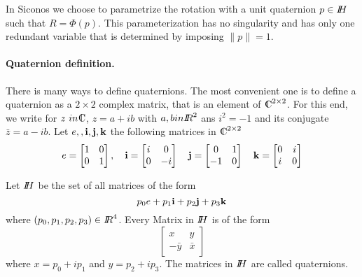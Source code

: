 In Siconos we choose to parametrize the rotation with a unit quaternion $p \in \mbox{\rm $I\!\!H$}$ such that $R = \Phi(p)$. This parameterization has no singularity and has only one redundant variable that is determined by imposing $\|p\|=1$.


\paragraph{Quaternion definition.} There is many ways to define quaternions. The most convenient one is to define a quaternion as 
a $2\times 2$ complex matrix, that is an element of $\CC^{2\times 2}$. For this end, we write for $z \ in \CC$, $z=a+ib$ with $a,b in \mbox{\rm $I\!\!R$}^2$ ans $i^2=-1$ and its conjugate $\bar z= a-ib$. Let ${e, \bf, i, j, k}$ the following matrices in $\CC^{2\times 2}$
\begin{equation}
  \label{eq:127}
  e =
  \begin{bmatrix}
    1 & 0 \\
    0 & 1  \\
  \end{bmatrix},
  \quad   \bf{i} =
  \begin{bmatrix}
    i & 0 \\
    0 & -i  \\
  \end{bmatrix}
  \quad   \bf{j} =
  \begin{bmatrix}
    0 & 1 \\
    -1 & 0  \\
  \end{bmatrix}
   \quad   \bf{k} =
  \begin{bmatrix}
    0 & i \\
    i & 0  \\
  \end{bmatrix}
\end{equation}

\begin{definition}
  Let $\mbox{\rm $I\!\!H$}$ be the set of all matrices of the form
  \begin{equation}
    \label{eq:128}
    p_0 e + p_1 {\bf i} + p_2 {\bf j} + p_3 {\bf k}
  \end{equation}
  where $(p_0,p_1,p_2,p_3) \in \mbox{\rm $I\!\!R$}^4$. Every Matrix in $\mbox{\rm $I\!\!H$}$ is of the form
  \begin{equation}
    \label{eq:129}
    \begin{bmatrix}
      x &y  \\
      - \bar y  & \bar x
    \end{bmatrix}
  \end{equation}
where $x = p_0 + i p_1$ and $y = p_2 + i p_3$. The matrices in $\mbox{\rm $I\!\!H$}$ are called quaternions. 
\end{definition}


